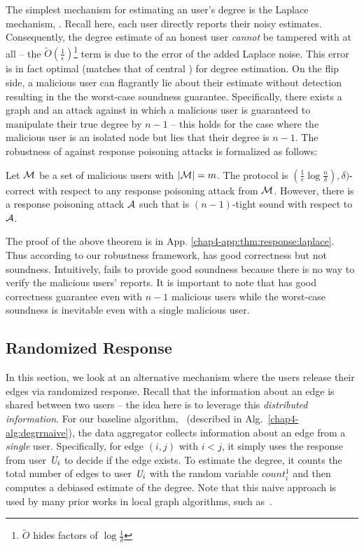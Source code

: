 The simplest mechanism for estimating an user's degree is the Laplace mechanism, \RLap. Recall here, each user directly reports their noisy estimates. Consequently, the degree estimate of an honest user \textit{cannot} be tampered with at all -- the $\tilde{O}(\frac{1}{\epsilon})$\footnote{$\tilde{O}$ hides factors of $\log\frac{1}{\delta}$ } term is due to the error of the added Laplace noise. This error is in fact optimal (matches that of central \DP) for degree estimation.  On the flip side, a malicious user can flagrantly lie about their estimate without detection resulting in the the worst-case soundness guarantee. Specifically,  there
exists a graph and an attack against \RLap{} in
which a malicious user is guaranteed to manipulate their true degree by $n -1$ --
this holds for the case where the malicious user is an isolated node but
lies that their degree is $n - 1$. The robustness of \RLap{} against response poisoning attacks is formalized as follows: 
\begin{thm}\label{chap4-thm:response:laplace}
	Let $\mathcal{M}$ be a set of malicious users with $|\mathcal{M}| = m$. The \RLap{} protocol is $(\frac{1}{\epsilon}\log\frac{n}{\delta}),\delta)$-correct with respect to any response poisoning attack from $\mathcal{M}$. However, there is a response poisoning attack $\mathcal{A}$ such that \RLap{} is $(n-1)$-tight sound with respect to $\mathcal{A}$.
\end{thm}
The proof of the above theorem is in App. \ref{chap4-app:thm:response:laplace}.
Thus according to our robustness framework, \RLap{} has good correctness but not soundness. Intuitively, \RLap{} fails to provide good soundness because there is no way to verify the malicious users' reports. 
It is important to note that  \RLap{} has good correctness guarantee even with $n-1$ malicious users while the worst-case soundness is inevitable even with a single malicious user. 
\subsection{Randomized Response}\label{chap4-sec:protocol:naive}
In this section, we look at an alternative mechanism where the users release their edges via randomized response. Recall that the information about an edge is shared between two users -- the idea here is to leverage this \textit{distributed information}. For our baseline algorithm, \DegRRNaive~(described in Alg.~\ref{chap4-alg:degrrnaive}), the data aggregator collects information about an edge from a \textit{single} user. Specifically, for edge $(i,j)$ with $i < j$, it simply uses the response from user $\textit{U}_i$ to decide if the edge exists. To estimate the degree, it counts the total number of edges to user $\textit{U}_i$ with the random variable $count_i^1$ and then computes a debiased estimate of the degree. Note that this naive approach is used by many prior works in local graph algorithms, such as~\cite{LDPGraph1, LDPGraph2,imola2021locally,imola_communication-efficient_2022}.
\setlength{\textfloatsep}{4pt}

